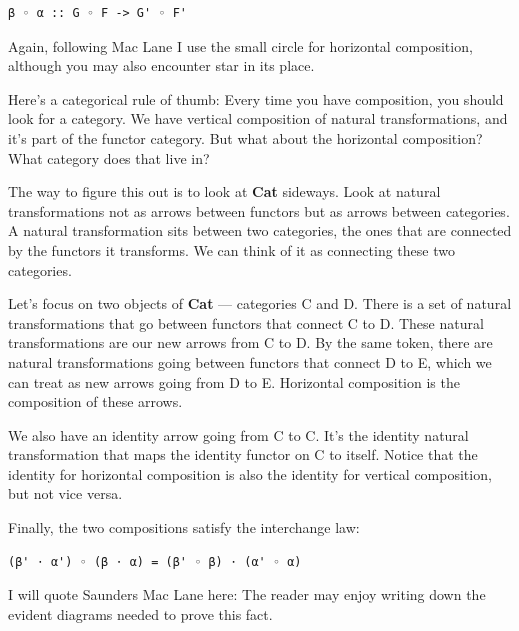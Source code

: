 \begin{verbatim}
β ◦ α :: G ◦ F -> G' ◦ F'
\end{verbatim}
Again, following Mac Lane I use the small circle for horizontal
composition, although you may also encounter star in its place.

Here's a categorical rule of thumb: Every time you have composition, you
should look for a category. We have vertical composition of natural
transformations, and it's part of the functor category. But what about
the horizontal composition? What category does that live in?

The way to figure this out is to look at \textbf{Cat} sideways. Look at
natural transformations not as arrows between functors but as arrows
between categories. A natural transformation sits between two
categories, the ones that are connected by the functors it transforms.
We can think of it as connecting these two categories.

\begin{figure}[H]
\centering
{}
\end{figure}

\noindent
Let's focus on two objects of \textbf{Cat} --- categories C and D. There
is a set of natural transformations that go between functors that
connect C to D. These natural transformations are our new arrows from C
to D. By the same token, there are natural transformations going between
functors that connect D to E, which we can treat as new arrows going
from D to E. Horizontal composition is the composition of these arrows.

We also have an identity arrow going from C to C. It's the identity
natural transformation that maps the identity functor on C to itself.
Notice that the identity for horizontal composition is also the identity
for vertical composition, but not vice versa.

Finally, the two compositions satisfy the interchange law:

\begin{verbatim}
(β' ⋅ α') ◦ (β ⋅ α) = (β' ◦ β) ⋅ (α' ◦ α)
\end{verbatim}

I will quote Saunders Mac Lane here: The reader may enjoy writing down
the evident diagrams needed to prove this fact.

